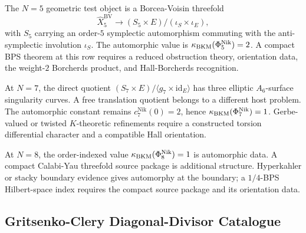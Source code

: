 The \(N=5\) geometric test object is a Borcea-Voisin threefold
\[
  \widehat X_5^{\mathrm{BV}}\longrightarrow
  (S_5\times E)/(\iota_S\times\iota_E),
\]
with \(S_5\) carrying an order-\(5\) symplectic automorphism commuting
with the anti-symplectic involution \(\iota_S\).  The automorphic value
is \(\kappa_{\mathrm{BKM}}(\Phi_5^{\mathrm{Nik}})=2\).  A compact BPS theorem at this
row requires a reduced obstruction theory, orientation data, the
weight-\(2\) Borcherds product, and Hall-Borcherds recognition.

At \(N=7\), the direct quotient
\((S_7\times E)/\langle g_7\times\mathrm{id}_E\rangle\) has three
elliptic \(A_6\)-surface singularity curves.  A free translation
quotient belongs to a different host problem.  The automorphic constant
remains \(c_7^{\mathrm{Nik}}(0)=2\), hence
\(\kappa_{\mathrm{BKM}}(\Phi_7^{\mathrm{Nik}})=1\).  Gerbe-valued or twisted
\(K\)-theoretic refinements require a constructed torsion differential
character and a compatible Hall orientation.

At \(N=8\), the order-indexed value
\(\kappa_{\mathrm{BKM}}(\Phi_8^{\mathrm{Nik}})=1\) is automorphic data.  A compact
Calabi-Yau threefold source package is additional structure.  Hyperkahler
or stacky boundary evidence gives automorphy at the boundary; a \(1/4\)-BPS
Hilbert-space index requires the compact source package and its
orientation data.

\subsection*{Gritsenko-Clery Diagonal-Divisor Catalogue}

